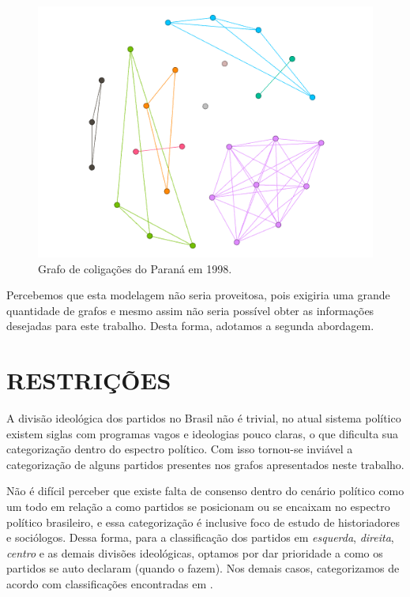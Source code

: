 \begin{figure}[H]
\centering
\includegraphics[width=1\textwidth]{img/parana-1998.png}
\caption{Grafo de coligações do Paraná em 1998.}
\end{figure}

Percebemos que esta modelagem não seria proveitosa, pois exigiria uma grande quantidade de grafos e mesmo assim não seria possível obter as informações desejadas para este trabalho. Desta forma, adotamos a segunda abordagem.

\section{\texorpdfstring{\MakeUppercase{Restrições}}{}}
\label{proposta__restricoes}

A divisão ideológica dos partidos no Brasil não é trivial, no atual sistema político existem siglas com programas vagos e ideologias pouco claras, o que dificulta sua categorização dentro do espectro político. Com isso tornou-se inviável a categorização de alguns partidos presentes nos grafos apresentados neste trabalho.

Não é difícil perceber que existe falta de consenso dentro do cenário político como um todo em relação a como partidos se posicionam ou se encaixam no espectro político brasileiro, e essa categorização é inclusive foco de estudo de historiadores e sociólogos. Dessa forma, para a classificação dos partidos em \emph{esquerda}, \emph{direita}, \emph{centro} e as demais divisões ideológicas, optamos por dar prioridade a como os partidos se auto declaram (quando o fazem). Nos demais casos, categorizamos de acordo com classificações encontradas em .

